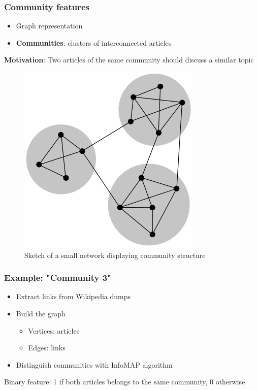 \begin{frame}
   \frametitle{Community features}
\begin{itemize}
\item Graph representation
\item \textbf{Communities}: clusters of interconnected articles
\end{itemize}
\textbf{Motivation}: Two articles of the same community should discuss a similar topic

  \begin{figure}[h]
   \includegraphics[height=0.4\textheight]{images/communities}
   \caption{Sketch of a small network displaying community structure}
  \end{figure}
 
\end{frame}

\begin{frame}
   \frametitle{Example: "Community 3"}
   \begin{itemize}
\item Extract links from Wikipedia dumps
\item Build the graph
\begin{itemize}
\item Vertices: articles
\item Edges: links
\end{itemize}
\item Distinguish communities with InfoMAP algorithm
\end{itemize}
Binary feature: 1 if both articles belongs to the same community, 0 otherwise
\end{frame}

